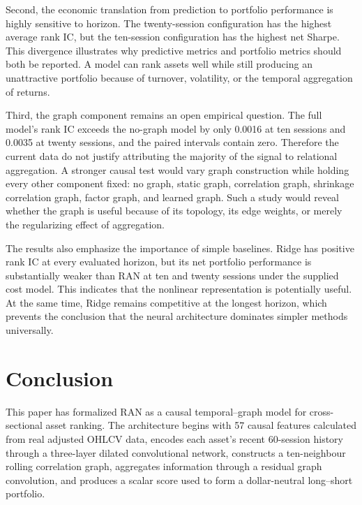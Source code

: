 \documentclass[10pt]{article}
\begin{document}
Second, the economic translation from prediction to portfolio performance is highly sensitive to horizon. The twenty-session configuration has the highest average rank IC, but the ten-session configuration has the highest net Sharpe. This divergence illustrates why predictive metrics and portfolio metrics should both be reported. A model can rank assets well while still producing an unattractive portfolio because of turnover, volatility, or the temporal aggregation of returns.

Third, the graph component remains an open empirical question. The full model's rank IC exceeds the no-graph model by only 0.0016 at ten sessions and 0.0035 at twenty sessions, and the paired intervals contain zero. Therefore the current data do not justify attributing the majority of the signal to relational aggregation. A stronger causal test would vary graph construction while holding every other component fixed: no graph, static graph, correlation graph, shrinkage correlation graph, factor graph, and learned graph. Such a study would reveal whether the graph is useful because of its topology, its edge weights, or merely the regularizing effect of aggregation.

The results also emphasize the importance of simple baselines. Ridge has positive rank IC at every evaluated horizon, but its net portfolio performance is substantially weaker than RAN at ten and twenty sessions under the supplied cost model. This indicates that the nonlinear representation is potentially useful. At the same time, Ridge remains competitive at the longest horizon, which prevents the conclusion that the neural architecture dominates simpler methods universally.

\section{Conclusion}

This paper has formalized RAN as a causal temporal--graph model for cross-sectional asset ranking. The architecture begins with 57 causal features calculated from real adjusted OHLCV data, encodes each asset's recent 60-session history through a three-layer dilated convolutional network, constructs a ten-neighbour rolling correlation graph, aggregates information through a residual graph convolution, and produces a scalar score used to form a dollar-neutral long--short portfolio.
\end{document}
